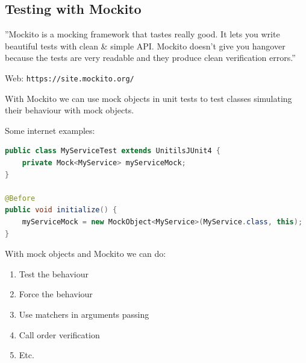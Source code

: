 \documentclass[11pt, xcolor=svgnames]{beamer}
\begin{document}

\subsection{Testing with Mockito}



\begin{frame}

''Mockito is a mocking framework that tastes really good. It lets you write beautiful tests with clean \& simple API. Mockito doesn't give you hangover because the tests are very readable and they produce clean verification errors.''

Web: \texttt{https://site.mockito.org/}
\end{frame}


\begin{frame}[fragile]
With Mockito we can use mock objects in unit tests to test classes simulating their behaviour with mock objects.

Some internet examples:

\begin{lstlisting}[language=Java,basicstyle=\tiny]
public class MyServiceTest extends UnitilsJUnit4 {
    private Mock<MyService> myServiceMock;
}

@Before
public void initialize() {
    myServiceMock = new MockObject<MyService>(MyService.class, this);
}
\end{lstlisting}
\end{frame}


\begin{frame}
With mock objects and Mockito we can do:

  \begin{enumerate}
  \item Test the behaviour
  \item Force the behaviour
  \item Use matchers in arguments passing
  \item Call order verification
  \item Etc.
  \end{enumerate}
\end{frame}
\end{document}
